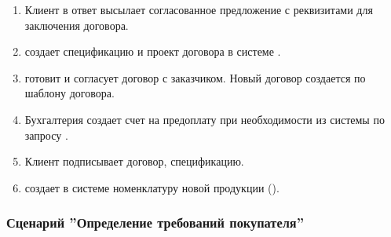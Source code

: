 \begin{enumerate}
\item Клиент в ответ высылает \manager  согласованное предложение с реквизитами для заключения договора. 
\item	\manager создает спецификацию и проект договора в системе \erp.

\item \manager готовит и согласует договор с заказчиком. Новый договор создается по шаблону договора.


\item Бухгалтерия создает счет на предоплату при необходимости из системы \erp по запросу \manager.

\item Клиент подписывает договор, спецификацию. %
\item \manager создает в системе \gofro  номенклатуру новой продукции ().
\end{enumerate}



\subsubsection{Сценарий ''Определение требований покупателя''}
\label{bp:sales_3}

